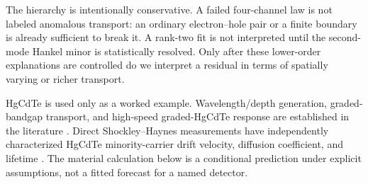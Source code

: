 \documentclass[11pt]{article}
\begin{document}
The hierarchy is intentionally conservative. A failed four-channel law is not labeled anomalous transport: an ordinary electron--hole pair or a finite boundary is already sufficient to break it. A rank-two fit is not interpreted until the second-mode Hankel minor is statistically resolved. Only after these lower-order explanations are controlled do we interpret a residual in terms of spatially varying or richer transport.

HgCdTe is used only as a worked example. Wavelength/depth generation, graded-bandgap transport, and high-speed graded-HgCdTe response are established in the literature \cite{Sang2022}. Direct Shockley--Haynes measurements have independently characterized HgCdTe minority-carrier drift velocity, diffusion coefficient, and lifetime \cite{Rothman2010}. The material calculation below is a conditional prediction under explicit assumptions, not a fitted forecast for a named detector.
\end{document}
